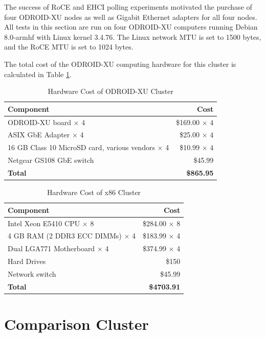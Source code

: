 \documentclass[11pt]{book}
\begin{document}
The success of RoCE and EHCI polling experiments motivated the purchase of four ODROID-XU
nodes as well as Gigabit Ethernet adapters for all four nodes.  All tests in this section
are run on four ODROID-XU computers running Debian 8.0-armhf with Linux kernel 3.4.76.
The Linux network MTU is set to 1500 bytes, and the RoCE MTU is set to 1024 bytes.

The total cost of the ODROID-XU computing hardware for this cluster is calculated in Table
\ref{xu-cost-table}.

\begin{table}
  \caption{Hardware Cost of ODROID-XU Cluster}\label{xu-cost-table}
  \centering
  \begin{tabular}{| l | r |}
    \hline
    \textbf{Component} & \textbf{Cost} \\ \hline
    ODROID-XU board $\times$ 4 & \$169.00 $\times$ 4 \\
    ASIX GbE Adapter $\times$ 4 & \$25.00 $\times$ 4 \\
    16 GB Class 10 MicroSD card, various vendors $\times$ 4 & \$10.99 $\times$ 4 \\
    Netgear GS108 GbE switch & \$45.99 \\
    \hline
    \textbf{Total} & \textbf{\$865.95} \\ \hline
  \end{tabular}
\end{table}

\begin{table}
  \caption{Hardware Cost of x86 Cluster}\label{x86-cost-table}
  \centering
  \begin{tabular}{| l | r |}
    \hline
    \textbf{Component} & \textbf{Cost} \\
    \hline
    Intel Xeon E5410 CPU $\times$ 8 & \$284.00 $\times$ 8 \\
    4 GB RAM (2 DDR3 ECC DIMMs) $\times$ 4 & \$183.99 $\times$ 4 \\
    Dual LGA771 Motherboard $\times$ 4 & \$374.99 $\times$ 4 \\
    Hard Drives & \$150 \\
    Network switch & \$45.99 \\
    \hline
    \textbf{Total} & \textbf{\$4703.91} \\ \hline
  \end{tabular}
\end{table}

\section{Comparison Cluster}
\end{document}
